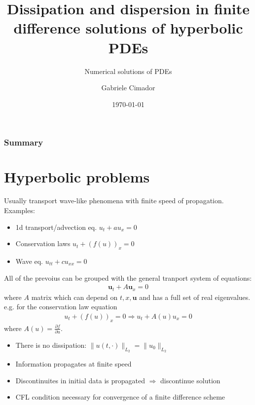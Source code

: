 \documentclass{beamer}
\title{Dissipation and dispersion in finite difference solutions of hyperbolic PDEs}
\subtitle{Numerical solutions of PDEs}
\author{Gabriele Cimador}
\institute{Data Science and Scientific computing at Università di Trieste}
\date{\today}
\begin{document}
\begin{frame}
\titlepage
\end{frame}
\begin{frame}
\frametitle{Summary}
\tableofcontents
\end{frame}
\section{Hyperbolic problems}
\begin{frame}
Usually transport wave-like phenomena with finite speed of propagation. Examples:
\begin{itemize}
  \item 1d transport/advection eq. $u_t + a u_x = 0$
  \item Conservation laws $u_t + (f(u))_x = 0$
  \item Wave eq. $u_{tt} + cu_{xx} = 0$
\end{itemize}
\end{frame}
\begin{frame}
All of the prevoius can be grouped with the general tranport system of equations:
\begin{align*}
\bm{u}_t + A\bm{u}_x = 0
\end{align*}
where $A$ matrix which can depend on $t, x, \bm{u}$ and has a full set of real eigenvalues.
\\ e.g. for the conservation law equation
\begin{align*}
u_t + (f(u))_x = 0 \Rightarrow u_t + A(u)u_x = 0
\end{align*}
 where $A(u) = \frac{\partial f}{\partial u}$.
\end{frame}
\begin{frame}
\begin{itemize}
  \item There is no dissipation: $\lVert u(t,\cdot) \rVert_{L_2} = \lVert u_0\rVert_{L_2}$
  \item Information propagates at finite speed
  \item Discontinuites in initial data is propagated $\Rightarrow$ discontinue solution
  \item CFL condition necessary for convergence of a finite difference scheme
\end{itemize}
\end{frame}
\end{document}
